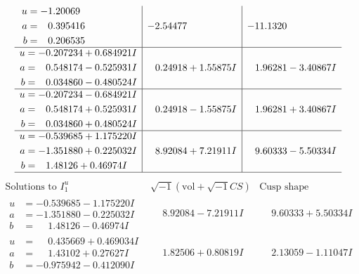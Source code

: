 \documentclass[1p]{elsarticle_modified}
\theoremstyle{definition}
\newcommand{\I}{\sqrt{-1}}
\begin{document}
$$\begin{array}{c|c|c}
\begin{aligned}
u &= -1.20069\phantom{ +0.000000I} \\
a &= \phantom{-}0.395416\phantom{ +0.000000I} \\
b &= \phantom{-}0.206535\phantom{ +0.000000I}\end{aligned}
 & -2.54477\phantom{ +0.000000I} & -11.1320\phantom{ +0.000000I} \\ \hline\begin{aligned}
u &= -0.207234 + 0.684921 I \\
a &= \phantom{-}0.548174 - 0.525931 I \\
b &= \phantom{-}0.034860 - 0.480524 I\end{aligned}
 & \phantom{-}0.24918 + 1.55875 I & \phantom{-}1.96281 - 3.40867 I \\ \hline\begin{aligned}
u &= -0.207234 - 0.684921 I \\
a &= \phantom{-}0.548174 + 0.525931 I \\
b &= \phantom{-}0.034860 + 0.480524 I\end{aligned}
 & \phantom{-}0.24918 - 1.55875 I & \phantom{-}1.96281 + 3.40867 I \\ \hline\begin{aligned}
u &= -0.539685 + 1.175220 I \\
a &= -1.351880 + 0.225032 I \\
b &= \phantom{-}1.48126 + 0.46974 I\end{aligned}
 & \phantom{-}8.92084 + 7.21911 I & \phantom{-}9.60333 - 5.50334 I\\
 \hline 
 \end{array}$$\newpage$$\begin{array}{c|c|c}  
\text{Solutions to }I^u_{1}& \I (\text{vol} + \sqrt{-1}CS) & \text{Cusp shape}\\
 \hline 
\begin{aligned}
u &= -0.539685 - 1.175220 I \\
a &= -1.351880 - 0.225032 I \\
b &= \phantom{-}1.48126 - 0.46974 I\end{aligned}
 & \phantom{-}8.92084 - 7.21911 I & \phantom{-}9.60333 + 5.50334 I \\ \hline\begin{aligned}
u &= \phantom{-}0.435669 + 0.469034 I \\
a &= \phantom{-}1.43102 + 0.27627 I \\
b &= -0.975942 - 0.412090 I\end{aligned}
 & \phantom{-}1.82506 + 0.80819 I & \phantom{-}2.13059 - 1.11047 I \\ \hline\begin{aligned}

\end{aligned}
\end{array}$$
\end{document}
